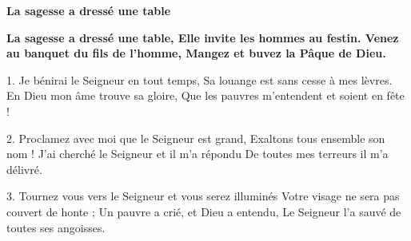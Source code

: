 \textbf{La sagesse a dressé une table}

\textbf{
La sagesse a dressé une table,
Elle invite les hommes au festin.
Venez au banquet du fils de l'homme,
Mangez et buvez la Pâque de Dieu.
}

1.
Je bénirai le Seigneur en tout temps,
Sa louange est sans cesse à mes lèvres.
En Dieu mon âme trouve sa gloire,
Que les pauvres m'entendent et soient en fête !

2.
Proclamez avec moi que le Seigneur est grand,
Exaltons tous ensemble son nom !
J'ai cherché le Seigneur et il m'a répondu
De toutes mes terreurs il m'a délivré.

3.
Tournez vous vers le Seigneur et vous serez illuminés
Votre visage ne sera pas couvert de honte ;
Un pauvre a crié, et Dieu a entendu,
Le Seigneur l'a sauvé de toutes ses angoisses.

